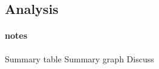 \documentclass[11pt, parskip=half*,twoside=false]{scrbook}
\begin{document}
%
%
%
%




\subsection{Analysis} \label{ssec:analysis}

\paragraph{notes}
Summary table 
Summary graph
Discuss
\end{document}
